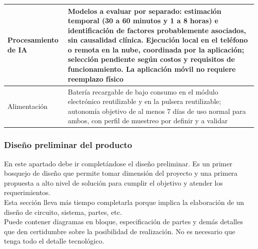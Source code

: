 {\begin{tabularx}{\textwidth}{|>{\raggedright\arraybackslash}p{}|>{\raggedright\arraybackslash}X|}
\hline
Procesamiento de IA & Modelos a evaluar por separado: estimación temporal (30 a 60 minutos y 1 a 8 horas) e identificación de factores probablemente asociados, sin causalidad clínica. Ejecución local en el teléfono o remota en la nube, coordinada por la aplicación; selección pendiente según costos y requisitos de funcionamiento. La aplicación móvil no requiere reemplazo físico \\
\hline
Alimentación & Batería recargable de bajo consumo en el módulo electrónico reutilizable y en la pulsera reutilizable; autonomía objetivo de al menos 7 días de uso normal para ambos, con perfil de muestreo por definir y a validar \\
\hline
\end{tabularx}
\par}


\subsubsection{Diseño preliminar del producto}
{\consigna
En este apartado debe ir completándose el diseño preliminar. Es un primer bosquejo de diseño que permite tomar dimensión del proyecto y una primera propuesta a alto nivel de solución para cumplir el objetivo y atender los requerimientos.\\
Esta sección lleva más tiempo completarla porque implica la elaboración de un diseño de circuito, sistema, partes, etc.\\
Puede contener diagramas en bloque, especificación de partes y demás detalles que den certidumbre sobre la posibilidad de realización. No es necesario que tenga todo el detalle tecnológico.
}

